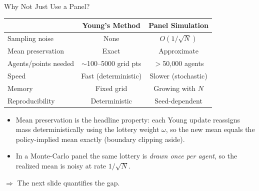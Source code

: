 \documentclass[aspectratio=169,11pt]{beamer}
\newcommand{\emphc}[1]{\textcolor{harvardcrimson}{#1}}
\begin{document}
\begin{frame}{Why Not Just Use a Panel?}
\small
\begin{center}
\begin{tabular}{@{}lcc@{}}
\toprule
& \textbf{Young's Method} & \textbf{Panel Simulation} \\
\midrule
Sampling noise & \emphc{None} & $O(1/\sqrt{N})$ \\
Mean preservation & \emphc{Exact} & Approximate \\
Agents/points needed & $\sim$100--5000 grid pts & $>$50,000 agents \\
Speed & \emphc{Fast} (deterministic) & Slower (stochastic) \\
Memory & Fixed grid & Growing with $N$ \\
Reproducibility & \emphc{Deterministic} & Seed-dependent \\
\bottomrule
\end{tabular}
\end{center}

\vspace{0.6em}
\begin{itemize}\footnotesize\itemsep2pt
    \item \emphc{Mean preservation} is the headline property: each Young update reassigns mass deterministically using the lottery weight $\omega$, so the new mean equals the policy-implied mean exactly (boundary clipping aside).
    \item In a Monte-Carlo panel the same lottery is \emph{drawn once per agent}, so the realized mean is noisy at rate $1/\sqrt{N}$.
\end{itemize}

\vspace{0.3em}
{\footnotesize $\Rightarrow$ The next slide quantifies the gap.}
\end{frame}
\end{document}
